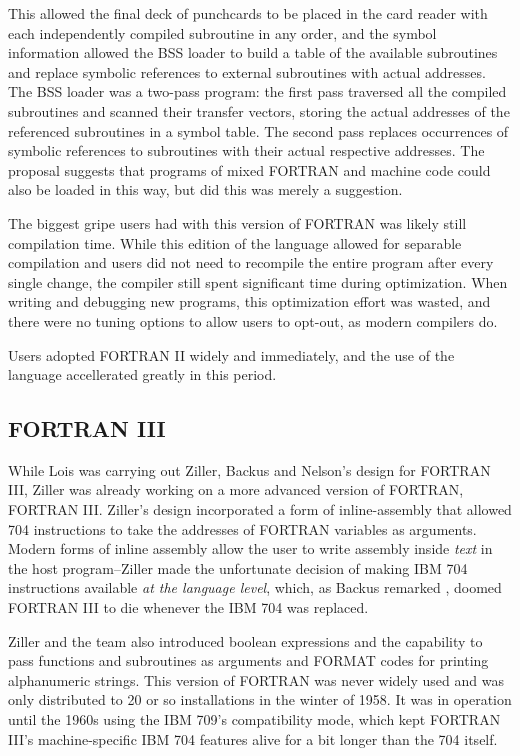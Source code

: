 This allowed the final deck of punchcards to be placed in the card reader
with each independently compiled subroutine in any order, and the symbol information
allowed the BSS loader to build a table of the available subroutines and replace
symbolic references to external subroutines with actual addresses.
The BSS loader was a two-pass program: the first pass traversed all the compiled
subroutines and scanned their transfer vectors, storing the actual addresses of
the referenced subroutines in a symbol table.
The second pass replaces occurrences of symbolic references to subroutines
with their actual respective addresses.
The proposal suggests that programs of mixed FORTRAN and machine code could
also be loaded in this way, but did this was merely a suggestion.

The biggest gripe users had with this version of FORTRAN was
likely still compilation time.
While this edition of the language allowed for separable compilation and users did not need to recompile
the entire program after every single change, the compiler still spent significant time
during optimization.
When writing and debugging new programs, this optimization effort was wasted, and
there were no tuning options to allow users to opt-out, as modern compilers do.

Users adopted FORTRAN II widely and immediately, and the use of the language
accellerated greatly in this period.

\subsection{FORTRAN III}

While Lois was carrying out Ziller, Backus and Nelson's design for FORTRAN III,
Ziller was already working on a more advanced version of FORTRAN, FORTRAN III.
Ziller's design incorporated a form of \gls{inline-assembly} that allowed
704 instructions to take the addresses of FORTRAN variables as arguments.
Modern forms of inline assembly allow the user to write assembly inside \textit{text}
in the host program--Ziller made the unfortunate decision of making IBM 704
instructions available \textit{at the language level}, which, as Backus remarked
\cite{hopl_backus_history_of_fortran}, doomed FORTRAN III to die whenever the IBM 704
was replaced.

Ziller and the team also introduced boolean expressions and the capability to
pass functions and subroutines as arguments and FORMAT codes for printing
alphanumeric strings.
This version of FORTRAN was never widely used and was only distributed to
20 or so installations in the winter of 1958.
It was in operation until the 1960s using the IBM 709's compatibility mode,
which kept FORTRAN III's machine-specific IBM 704 features alive for a bit longer
than the 704 itself.


